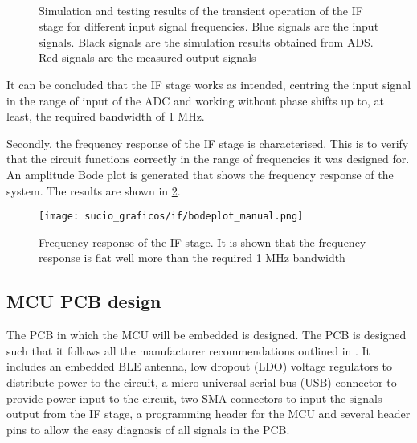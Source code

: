 \begin{figure}[htb]
	\centering
	 \\
	\caption{Simulation and testing results of the transient operation of the IF stage for different input signal frequencies. Blue signals are the input signals. Black signals are the simulation results obtained from ADS. Red signals are the measured output signals \label{fig:if_signal_test}}
\end{figure}

It can be concluded that the IF stage works as intended, centring the input signal in the range of input of the ADC and working without phase shifts up to, at least, the required bandwidth of 1 MHz.

Secondly, the frequency response of the IF stage is characterised. This is to verify that the circuit functions correctly in the range of frequencies it was designed for. An amplitude Bode plot is generated that shows the frequency response of the system. The results are shown in \cref{fig:if_bode}.

\begin{figure}[htb]
	\centering
	\texttt{[image: sucio\_graficos/if/bodeplot\_manual.png]}
	\caption{Frequency response of the IF stage. It is shown that the frequency response is flat well more than the required 1 MHz bandwidth}
	\label{fig:if_bode}
\end{figure}

\subsection{MCU PCB design}\label{sec:mcu-pcb-design}

The PCB in which the MCU will be embedded is designed. The PCB is designed such that it follows all the manufacturer recommendations outlined in \cite{STMicroelectronics2022, STMicroelectronics2022a, STMicroelectronics2022b}. It includes an embedded BLE antenna, low dropout (LDO) voltage regulators to distribute power to the circuit, a micro universal serial bus (USB) connector to provide power input to the circuit, two SMA connectors to input the signals output from the IF stage, a programming header for the MCU and several header pins to allow the easy diagnosis of all signals in the PCB.

